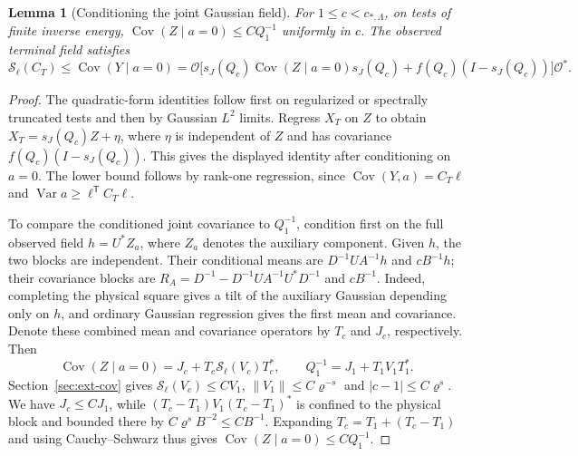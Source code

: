 \documentclass[11pt]{article}
\newtheorem{lemma}[theorem]{Lemma}
\theoremstyle{definition}
\begin{document}
\begin{lemma}[Conditioning the joint Gaussian field]
\label{lem:joint-conditioned-covariance}
For \(1\le c<c_{*,\Lambda}\), on tests of finite inverse energy,
\(\operatorname{Cov}(Z\mid a=0)\le C Q_1^{-1}\) uniformly in
\(c\). The observed terminal field satisfies
\begin{equation}
 \mathcal S_\ell(C_T)\le\operatorname{Cov}(Y\mid a=0)
 =\mathcal O\big[
 s_J(Q_c)\operatorname{Cov}(Z\mid a=0)s_J(Q_c)
 + f(Q_c)(I-s_J(Q_c))\big]\mathcal O^*.
\end{equation}
\end{lemma}

\begin{proof}
The quadratic-form identities follow first on regularized or
spectrally truncated tests and then by Gaussian \(L^2\) limits.
Regress \(X_T\) on \(Z\) to obtain \(X_T=s_J(Q_c)Z+\eta\), where
\(\eta\) is independent of \(Z\) and has covariance
\(f(Q_c)(I-s_J(Q_c))\). This gives the displayed identity after
conditioning on \(a=0\). The lower bound follows by rank-one regression,
since \(\operatorname{Cov}(Y,a)=C_T\ell\) and
\(\operatorname{Var}a\ge\ell^{\mathsf T}C_T\ell\).

To compare the conditioned joint covariance to \(Q_1^{-1}\), condition
first on the full observed field \(h=U^*Z_a\), where \(Z_a\) denotes
the auxiliary component. Given \(h\), the two blocks are independent.
Their conditional means are \(D^{-1}UA^{-1}h\) and \(cB^{-1}h\);
their covariance blocks are
\(R_A=D^{-1}-D^{-1}UA^{-1}U^*D^{-1}\) and \(cB^{-1}\).
Indeed, completing the physical square gives a tilt of the auxiliary
Gaussian depending only on \(h\), and ordinary Gaussian regression
gives the first mean and covariance. Denote these combined mean and
covariance operators by \(T_c\) and \(J_c\), respectively. Then
\begin{equation}
 \operatorname{Cov}(Z\mid a=0)=J_c+T_c\mathcal S_\ell(V_c)T_c^*,
 \qquad Q_1^{-1}=J_1+T_1 V_1T_1^*.
\end{equation}
Section~\ref{sec:ext-cov} gives
\(\mathcal S_\ell(V_c)\le C V_1\), \(\|V_1\|\le C\varrho^{-s}\) and
\(|c-1|\le C\varrho^s\). We have \(J_c\le C J_1\), while
\((T_c-T_1) V_1(T_c-T_1)^*\) is confined to the physical block and
bounded there by \(C\varrho^s B^{-2}\le C B^{-1}\). Expanding
\(T_c=T_1+(T_c-T_1)\) and using Cauchy--Schwarz thus gives
\(\operatorname{Cov}(Z\mid a=0)\le C Q_1^{-1}\).
\end{proof}
\end{document}
